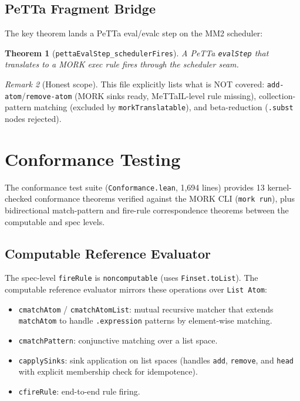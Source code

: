 \documentclass[11pt]{article}
\newtheorem{theorem}{Theorem}[section]
\theoremstyle{definition}
\theoremstyle{remark}
\newtheorem{remark}[theorem]{Remark}
\newcommand{\MORK}{\textup{MORK}}
\begin{document}
\subsection{PeTTa Fragment Bridge}

The key theorem lands a PeTTa eval/evalc step on the MM2 scheduler:

\begin{theorem}[\texttt{pettaEvalStep\_schedulerFires}]
A PeTTa \texttt{evalStep} that translates to a \MORK{} exec rule fires
through the scheduler seam.
\end{theorem}

\begin{remark}[Honest scope]
This file explicitly lists what is NOT covered:
\texttt{add-atom}/\texttt{remove-atom} (MORK sinks ready, MeTTaIL-level
rule missing), collection-pattern matching (excluded by
\texttt{morkTranslatable}), and beta-reduction (\texttt{.subst} nodes
rejected).
\end{remark}

\section{Conformance Testing}
\label{sec:conformance}

The conformance test suite (\texttt{Conformance.lean}, 1{,}694 lines)
provides 13 kernel-checked conformance theorems verified against the
\MORK{} CLI (\texttt{mork run}), plus bidirectional match-pattern and
fire-rule correspondence theorems between the computable and spec levels.

\subsection{Computable Reference Evaluator}

The spec-level \texttt{fireRule} is \texttt{noncomputable} (uses
\texttt{Finset.toList}).  The computable reference evaluator mirrors
these operations over \texttt{List Atom}:

\begin{itemize}[nosep]
  \item \texttt{cmatchAtom} / \texttt{cmatchAtomList}: mutual recursive
    matcher that extends \texttt{matchAtom} to handle \texttt{.expression}
    patterns by element-wise matching.
  \item \texttt{cmatchPattern}: conjunctive matching over a list space.
  \item \texttt{capplySinks}: sink application on list spaces (handles
    \texttt{add}, \texttt{remove}, and \texttt{head} with explicit
    membership check for idempotence).
  \item \texttt{cfireRule}: end-to-end rule firing.
\end{itemize}
\end{document}
